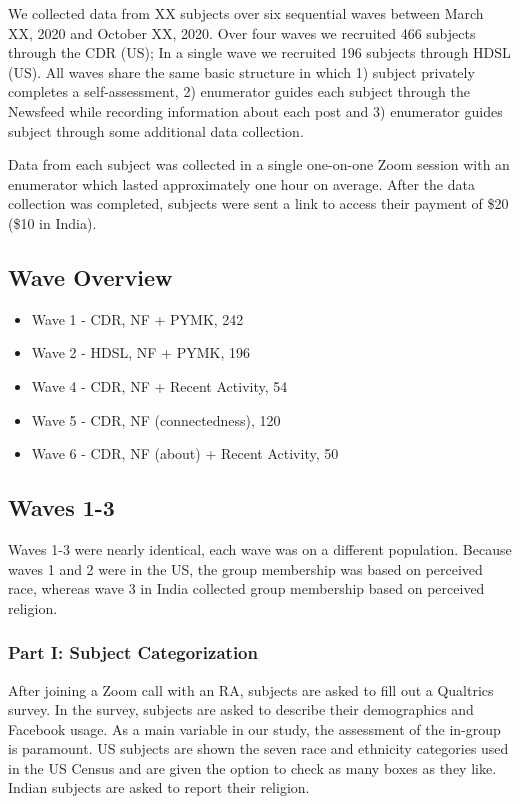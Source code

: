 \documentclass[12pt,letterpaper]{article}
\begin{document}
We collected data from XX subjects over six sequential waves between March XX, 2020 and October XX, 2020. Over four waves we recruited 466 subjects through the CDR (US); In a single wave we recruited 196 subjects through HDSL (US). All waves share the same basic structure in which 1) subject privately completes a self-assessment, 2) enumerator guides each subject through the Newsfeed while recording information about each post and 3) enumerator guides subject through some additional data collection.

Data from each subject was collected in a single one-on-one Zoom session with an enumerator which lasted approximately one hour on average. After the data collection was completed, subjects were sent a link to access their payment of \$20 (\$10 in India).

\subsection{Wave Overview}
\begin{itemize}
    \item Wave 1 - CDR, NF + PYMK, 242
    \item Wave 2 - HDSL, NF + PYMK, 196
    \item Wave 4 - CDR, NF + Recent Activity, 54
    \item Wave 5 - CDR, NF (connectedness), 120
    \item Wave 6 - CDR, NF (about) + Recent Activity, 50
\end{itemize}

\subsection{Waves 1-3}

Waves 1-3 were nearly identical, each wave was on a different population. Because waves 1 and 2 were in the US, the group membership was based on perceived race, whereas wave 3 in India collected group membership based on perceived religion.

\subsubsection{Part I: Subject Categorization} After joining a Zoom call with an RA, subjects are asked to fill out a Qualtrics survey. In the survey, subjects are asked to describe their demographics and Facebook usage. As a main variable in our study, the assessment of the in-group is paramount. US subjects are shown the seven race and ethnicity categories used in the US Census and are given the option to check as many boxes as they like. Indian subjects are asked to report their religion.
\end{document}
